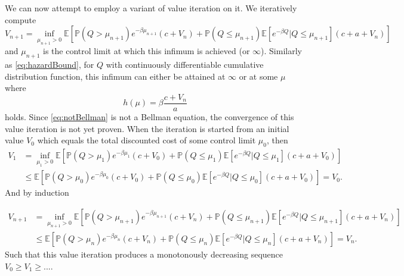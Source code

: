 We can now attempt to employ a variant of value iteration on it.
We iteratively compute
$$V_{n+1}=\inf\limits_{\mu_{n+1}>0}\mathbb{E}[\mathbb{P}(Q>\mu_{n+1})e^{-\beta \mu_{n+1}}(c+V_{n})+\mathbb{P}(Q\leq \mu_{n+1})\mathbb{E}[e^{-\beta Q}|Q\leq \mu_{n+1}](c+a+V_{n})]$$
and $\mu_{n+1}$ is the control limit at which this infimum is achieved (or $\infty$).
Similarly as \eqref{eq:hazardBound}, for $Q$ with continuously differentiable cumulative distribution function, this infimum can either be attained at $\infty$ or at some $\mu$ where
$$
h(\mu)= \beta\frac{c+V_n}{a}
$$
holds.
Since \eqref{eq:notBellman} is not a Bellman equation, the convergence of this value iteration is not yet proven.
When the iteration is started from an initial value $V_0$ which equals the total discounted cost of some control limit $\mu_0$, then 
\begin{equation}
\begin{split}
V_1&=\inf\limits_{\mu_1>0}\mathbb{E}[\mathbb{P}(Q>\mu_1)e^{-\beta \mu_1}(c+V_0)+\mathbb{P}(Q\leq \mu_1)\mathbb{E}[e^{-\beta Q}|Q\leq \mu_1](c+a+V_0)]\\
&\leq\mathbb{E}[\mathbb{P}(Q>\mu_0)e^{-\beta \mu_0}(c+V_0)+\mathbb{P}(Q\leq \mu_0)\mathbb{E}[e^{-\beta Q}|Q\leq \mu_0](c+a+V_0)]=V_0.
\end{split}
\end{equation}
And by induction

\begin{equation}
\begin{split}
V_{n+1}&=\inf\limits_{\mu_{n+1}>0}\mathbb{E}[\mathbb{P}(Q>\mu_{n+1})e^{-\beta \mu_{n+1}}(c+V_n)+\mathbb{P}(Q\leq \mu_{n+1})\mathbb{E}[e^{-\beta Q}|Q\leq \mu_{n+1}](c+a+V_n)]\\
&\leq\mathbb{E}[\mathbb{P}(Q>\mu_n)e^{-\beta \mu_n}(c+V_n)+\mathbb{P}(Q\leq \mu_n)\mathbb{E}[e^{-\beta Q}|Q\leq \mu_n](c+a+V_n)]=V_n.
\end{split}
\end{equation}
Such that this value iteration produces a monotonously decreasing sequence $V_0\geq V_1\geq...$.
